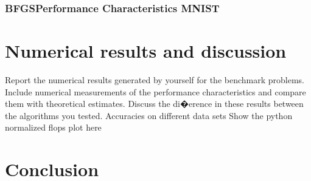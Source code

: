 \documentclass[10pt,twocolumn]{article}
\begin{document}
\subsubsection{BFGSPerformance Characteristics MNIST}

\section{Numerical results and discussion}
Report the numerical results generated by yourself for the benchmark problems. Include numerical measurements of the performance characteristics and compare them with theoretical estimates. Discuss the di�erence in these results between the algorithms you tested.
Accuracies on different data sets
Show the python normalized flops plot here
\section{Conclusion}







\end{document}
